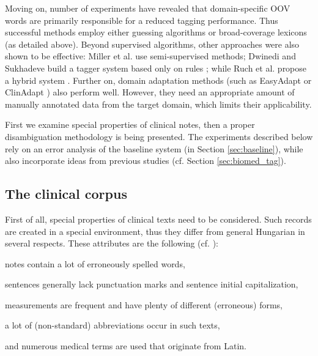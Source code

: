 Moving on, number of experiments have revealed \cite{ferraro2013improving,ruch2000minimal,Smith2006} that domain-specific OOV words are primarily responsible for a reduced tagging performance. Thus successful methods employ either guessing algorithms \cite{barrett2011token,divita2006dtagger,rost2008lessons,ruch2000minimal,Smith2006} or broad-coverage lexicons (as detailed above). Beyond supervised algorithms, other approaches were also shown to be effective: Miller et al. \cite{miller2007building} use semi-supervised methods;
Dwinedi and Sukhadeve build a tagger system based only on rules \cite{dwivedi8rule}; while Ruch et al. propose a hybrid system \cite{ruch2000minimal}. Further on, domain adaptation methods (such as EasyAdapt \cite{daume2007frustratingly} or ClinAdapt \cite{ferraro2013improving} 
) also perform well. However, they need an appropriate amount of manually annotated data from the target domain, which limits their applicability. 

First we examine special properties of clinical notes, then a proper disambiguation methodology is being presented. The experiments described below rely on an error analysis of the baseline system (in Section \ref{sec:baseline}), while also incorporate ideas from previous studies (cf. Section  \ref{sec:biomed_tag}).

\subsection{The clinical corpus}

First of all, special properties of clinical texts need to be considered. Such records are created in a special environment, thus they differ from general Hungarian in several respects. These attributes are the following (cf. \cite{Orosz2013a,Siklosi2013b,Siklosi2012}):
\begin{inparaenum}
 \item notes contain a lot of erroneously spelled words,
 \item sentences generally lack punctuation marks and sentence initial capitalization, 
 \item measurements are frequent and have plenty of different (erroneous) forms,
 \item a lot of (non-standard) abbreviations occur in such texts, 
 \item and numerous medical terms are used that originate from Latin.
\end{inparaenum}

